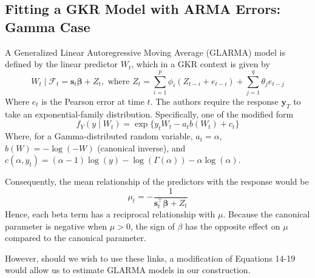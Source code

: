 \documentclass{article}
\begin{document}
\subsection*{Fitting a GKR Model with ARMA Errors: Gamma Case}

A Generalized Linear Autoregressive Moving Average (GLARMA) model is defined by the linear predictor $W_t$, which in a GKR context is given by
$$
W_t  \mid \mathcal{F}_t = \mathbf{s}_t \boldsymbol{\beta} + Z_t, \text{ where } Z_t = \sum_{i=1}^p \phi_i (Z_{t-i} + e_{t-i}) + \sum_{j = 1}^q \theta_j e_{t-j}
$$
Where $e_t$ is the Pearson error at time $t$. The authors require the response $\mathbf{y}_T$ to take an exponential-family distribution. Specifically, one of the modified form
$$
f_Y(y \mid W_t) = \exp\{y_t W_t - a_t b(W_t) + c_t\}
$$
Where, for a Gamma-distributed random variable, $a_t = \alpha$, $b(W) =  -\log(-W)$ (canonical inverse), and $c(\alpha, y_t) = (\alpha - 1)\log(y) - \log(\Gamma(\alpha)) - \alpha \log(\alpha)$.

Consequently, the mean relationship of the predictors with the response would be 
$$
\mu_t = - \frac{1}{\mathbf{s}_t^{\top}\boldsymbol{\beta} + Z_t}
$$
Hence, each beta term has a reciprocal relationship with $\mu$. Because the canonical parameter is negative when $\mu > 0$, the sign of $\beta$ has the opposite effect on $\mu$ compared to the canonical parameter.

However, should we wish to use these links, a modification of Equations 14-19 would allow us to estimate GLARMA  models in our construction.
\end{document}
